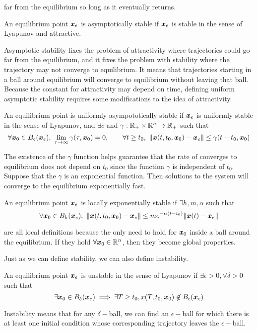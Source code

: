 far from the equilibrium so long as it eventually returns.
\begin{definition}
	An equilibrium point $\boldsymbol{x}_e$ is asymptotically stable if $\boldsymbol{x}_e$ is
	stable in the sense of Lyapunov and attractive.
	\label{defn:asymptotic-stability}
\end{definition}
Asymptotic stability fixes the problem of attractivity where trajectories could
go far from the equilibrium, and it fixes the problem with stability where the
trajectory may not converge to equilibrium. It means that trajectories starting
in a ball around equilibrium will converge to equilibrium without leaving that
ball. Because the constant for attractivity may depend on time, defining
uniform asymptotic stability requires some modifications to the idea of
attractivity.
\begin{definition}
	An equilibrium point is uniformly asympototically stable if $\boldsymbol{x}_e$ is
	uniformly stable in the sense of Lyapunov, and $\exists c$ and
	$\gamma:\mathbb{R}_+\times\mathbb{R}^n\to\mathbb{R}_+$ such that \[
		\forall \bs{x}_0\in B_c(\bs{x}_e),\ \lim_{\tau\to\infty}\gamma(\tau,
		\bs{x}_0) = 0, \qquad \forall t\geq t_0,\ \|\bs{x}(t, t_0, \bs{x}_0) - \bs{x}_e\| \leq
		\gamma(t-t_0, \bs{x}_0)
	\]
	\label{defn:uniform-asymptotic-stability}
\end{definition}
The existence of the $\gamma$ function helps guarantee that the rate of
converges to equilibrium does not depend on $t_0$ since the function $\gamma$ is
independent of $t_0$.
Suppose that the $\gamma$ is an exponential function. Then solutions to the
system will converge to the equilibrium exponentially fast.
\begin{definition}
	An equilibrium point $\boldsymbol{x}_e$ is locally exponentially stable if $\exists
	h,m,\alpha$
	such that \[
		\forall \boldsymbol{x}_0\in B_h(\boldsymbol{x}_e),\ \|\boldsymbol{x}(t, t_0, \boldsymbol{x}_0) -
		\boldsymbol{x}_e\| \leq me^{-\alpha(t - t_0)}\|\boldsymbol{x}(t) - \boldsymbol{x}_e\|
	\]
	\label{defn:exponential-stability}
\end{definition}
are all local definitions because the only need to hold for $\boldsymbol{x}_0$ inside a
ball around the equilibrium. If they hold $\forall \boldsymbol{x}_0\in\mathbb{R}^n$, then they
become global properties.

Just as we can define stability, we can also define instability.
\begin{definition}
	An equilibrium point $\boldsymbol{x}_e$ is unstable in the sense of Lyapunov if
	$\exists \epsilon > 0, \forall \delta > 0$ such that \[
		\exists \boldsymbol{x}_0\in B_\delta(\boldsymbol{x}_e) \implies \exists T\geq t_0, x(T, t_0,
		\boldsymbol{x}_0) \not\in B_\epsilon(\boldsymbol{x}_e)
	\]
	\label{defn:unstable}
\end{definition}
Instability means that for any $\delta-$ball, we can find an $\epsilon-$ball for
which there is at least one initial condition whose corresponding trajectory
leaves the $\epsilon-$ball.
